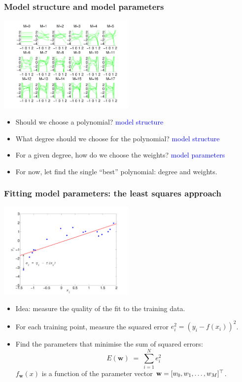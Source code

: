 \documentclass[10pt]{beamer}
\newcommand{\Blue}{\textcolor{blue}}
\newcommand{\bfw}{\mathbf w}
\newcommand{\T}{{\scriptsize^{\top}}}
\begin{document}
\begin{frame}
\frametitle{Model structure and model parameters}

\centerline{\includegraphics[width=0.5\textwidth]{random_polynomials.pdf}}

\begin{itemize}
\item Should we choose a polynomial? \hfill\Blue{model structure}
\item What degree should we choose for the polynomial? \hfill\Blue{model structure}
\item For a given degree, how do we choose the weights? \hfill\Blue{model parameters}
\item For now, let find the single ``best'' polynomial: degree and weights.
\end{itemize}


\end{frame}
\begin{frame}
\frametitle{Fitting model parameters: the least squares approach}

\centerline{\includegraphics[width=0.5\textwidth]{toy_data_example_fit.pdf}}

\begin{itemize}
\item Idea: measure the quality of the fit to the training data.
\item For each training point, measure the squared error $e_i^2=(y_i-f(x_i))^2$.
\item Find the parameters that minimise the sum of squared errors:
%
\[
E(\bfw)\;=\;\sum_{i=1}^N e_i^2
\]
%
$f_\bfw(x)$ is a function of the parameter vector 
$\bfw=[w_0, w_1, \ldots, w_M]\T$.
\end{itemize}


\end{frame}
\end{document}

